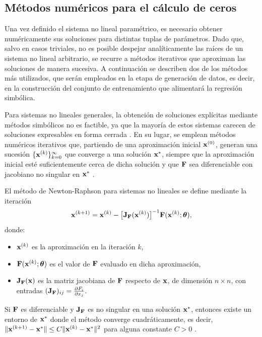 \subsection{Métodos numéricos para el cálculo de ceros}

Una vez definido el sistema no lineal paramétrico, es necesario obtener numéricamente sus soluciones para distintas tuplas de parámetros. Dado que, salvo en casos triviales, no es posible despejar analíticamente las raíces de un sistema no lineal arbitrario, se recurre a métodos iterativos que aproximan las soluciones de manera sucesiva. A continuación se describen dos de los métodos más utilizados, que serán empleados en la etapa de generación de datos, es decir, en la construcción del conjunto de entrenamiento que alimentará la regresión simbólica.

Para sistemas no lineales generales, la obtención de soluciones explícitas mediante métodos simbólicos no es factible, ya que la mayoría de estos sistemas carecen de soluciones expresables en forma cerrada \cite{burden2010numerical}. En su lugar, se emplean métodos numéricos iterativos que, partiendo de una aproximación inicial \(\mathbf{x}^{(0)}\), generan una sucesión \(\{\mathbf{x}^{(k)}\}_{k=0}^{\infty}\) que converge a una solución \(\mathbf{x}^*\), siempre que la aproximación inicial esté suficientemente cerca de dicha solución y que \(\mathbf{F}\) sea diferenciable con jacobiano no singular en \(\mathbf{x}^*\) \cite{nocedal2006numerical}.

El método de Newton-Raphson para sistemas no lineales \cite{burden2010numerical} se define mediante la iteración
\begin{equation}
\mathbf{x}^{(k+1)} = \mathbf{x}^{(k)} - \bigl[\mathbf{J}_{\mathbf{F}}(\mathbf{x}^{(k)})\bigr]^{-1} \mathbf{F}(\mathbf{x}^{(k)}; \boldsymbol{\theta}), \label{eq:newton}
\end{equation}
donde:
\begin{itemize}
    \item \(\mathbf{x}^{(k)}\) es la aproximación en la iteración \(k\),
    \item \(\mathbf{F}(\mathbf{x}^{(k)}; \boldsymbol{\theta})\) es el valor de \(\mathbf{F}\) evaluado en dicha aproximación,
    \item \(\mathbf{J}_{\mathbf{F}}(\mathbf{x})\) es la matriz jacobiana de \(\mathbf{F}\) respecto de \(\mathbf{x}\), de dimensión \(n \times n\), con entradas
          \((\mathbf{J}_{\mathbf{F}})_{ij} = \frac{\partial F_i}{\partial x_j}\).
\end{itemize}
Si \(\mathbf{F}\) es diferenciable y \(\mathbf{J}_{\mathbf{F}}\) es no singular en una solución \(\mathbf{x}^*\), entonces existe un entorno de \(\mathbf{x}^*\) donde el método converge cuadráticamente, es decir,
\(\|\mathbf{x}^{(k+1)} - \mathbf{x}^*\| \le C \|\mathbf{x}^{(k)} - \mathbf{x}^*\|^2\) para
alguna constante \(C > 0\) \cite{nocedal2006numerical}.

